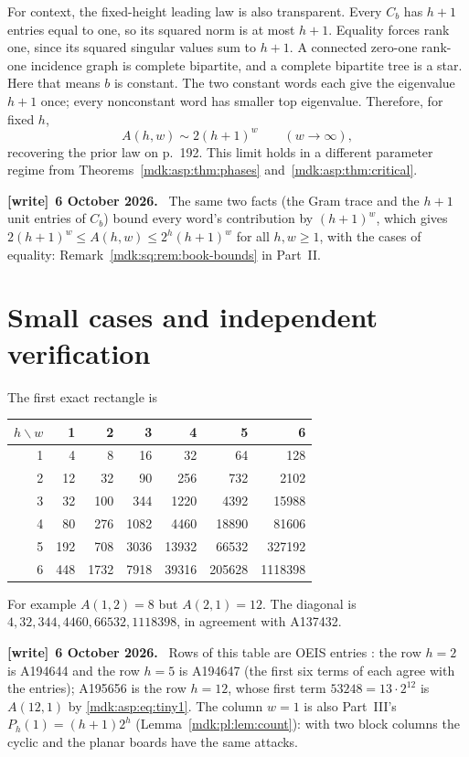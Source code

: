\documentclass[11pt,letterpaper]{article}
\numberwithin{equation}{section}
\theoremstyle{remark}\newtheorem{remark}[theorem]{Remark}
\newenvironment{writenote}[1][]{\par\smallskip\begingroup\small
 \noindent\textbf{[write]}\if\relax\detokenize{#1}\relax\else~\textbf{#1.}\fi\ }%
 {\par\endgroup\smallskip}
\begin{document}
For context, the fixed-height leading law is also transparent. Every $C_b$ has $h+1$ entries equal to one, so its squared norm is at most $h+1$. Equality forces rank one, since its squared singular values sum to $h+1$. A connected zero-one rank-one incidence graph is complete bipartite, and a complete bipartite tree is a star. Here that means $b$ is constant. The two constant words each give the eigenvalue $h+1$ once; every nonconstant word has smaller top eigenvalue. Therefore, for fixed $h$,
\[
A(h,w)\sim2(h+1)^w\qquad(w\to\infty),
\]
recovering the prior law on p.~192. This limit holds in a different parameter regime from Theorems~\ref{mdk:asp:thm:phases} and~\ref{mdk:asp:thm:critical}.
\begin{writenote}[6 October 2026]
The same two facts (the Gram trace and the $h+1$ unit entries of $C_b$) bound every word's contribution by $(h+1)^w$, which gives $2(h+1)^w\le A(h,w)\le2^h(h+1)^w$ for all $h,w\ge1$, with the cases of equality: Remark~\ref{mdk:sq:rem:book-bounds} in Part~II.
\end{writenote}

\section{Small cases and independent verification}\label{mdk:asp:sec:checks}
The first exact rectangle is
\begin{center}\small
\begin{tabular}{r|rrrrrr}
\toprule
$h\backslash w$&1&2&3&4&5&6\\\midrule
1&4&8&16&32&64&128\\
2&12&32&90&256&732&2102\\
3&32&100&344&1220&4392&15988\\
4&80&276&1082&4460&18890&81606\\
5&192&708&3036&13932&66532&327192\\
6&448&1732&7918&39316&205628&1118398\\\bottomrule
\end{tabular}
\end{center}
For example $A(1,2)=8$ but $A(2,1)=12$. The diagonal is $4,32,344,4460,66532,1118398$, in agreement with A137432.
\begin{writenote}[6 October 2026]
Rows of this table are OEIS entries \cite{oeisRect}: the row $h=2$ is A194644 and the row $h=5$ is A194647 (the first six terms of each agree with the entries); A195656 is the row $h=12$, whose first term $53248=13\cdot2^{12}$ is $A(12,1)$ by \eqref{mdk:asp:eq:tiny1}. The column $w=1$ is also Part~III's $P_h(1)=(h+1)2^h$ (Lemma~\ref{mdk:pl:lem:count}): with two block columns the cyclic and the planar boards have the same attacks.
\end{writenote}
\end{document}
